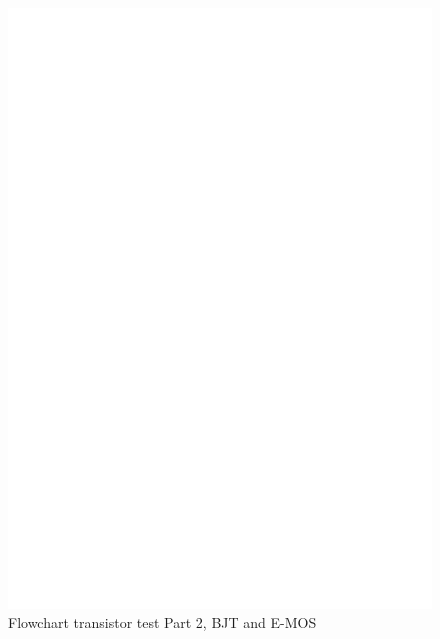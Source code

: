 \begin{figure}[H]
\centering
\includegraphics[]{../FIG/CheckSemi2.eps}
\caption{Flowchart transistor test Part 2, BJT and E-MOS}
\label{fig:ChkSemi2}
\end{figure}


